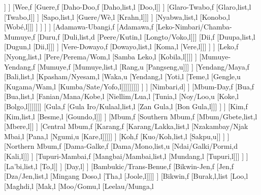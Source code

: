 \documentclass[landscape]{standalone}
\begin{document}
\begin{forest}
								[Tajausohn,l]]
							]
							[Wee,f
								[Guere,f
									[Daho-Doo,f
										[Daho,list,l
										[Doo,l]]
									]
									[Glaro-Twabo,f
										[Glaro,list,l
										[Twabo,l]]
									]
									[Sapo,list,l
									[Guere/Wè,l
									[Krahn,l]]]
								]
								[Nyabwa,list,l
								[Konobo,l
								[Wobé,l]]]
							]
						]
					]
				]
				[Adamawa-Ubangi,f
					[Adamawa,f
						[Leko-Nimbari/Chamba-Mumuye,f
							[Duru,f
								[Duli,list,d
								[Peere/Kutin,l
								[Longto/Voko,l]]]
								[Dii,f
									[Duupa,list,l
									[Dugun,l
									[Dii,l]]]
								]
								[Vere-Dowayo,f
									[Dowayo,list,l
									[Koma,l
									[Vere,l]]]
								]
							]
							[Leko,f
								[Nyong,list,l
								[Pere/Perema/Wom,l
								[Samba  Leko,l
								[Kobila,l]]]]
							]
							[Mumuye-Yendang,f
								[Mumuye,f
									[Mumuye,list,l
									[Rang,u
									[Pangseng,u]]]
								]
								[Yendang/Maya,f
									[Bali,list,l
									[Kpasham/Nyesam,l
									[Waka,u
									[Yendang,l
									[Yoti,l
									[Teme,l
									[Gengle,u
									[Kugama/Wam,l
									[Kumba/Sate/Yofo,l]]]]]]]]]
								]
							]
							[Nimbari,d]
						]
						[Mbum-Day,f
							[Bua,f
								[Bua,list,l
								[Fanian/Mana/Kobe,l
								[Niellim/Lua,l
								[Tunia,l
								[Noy/Loo,u
								[Koke,l
								[Bolgo,l]]]]]]]
								[Gula,f
									[Gula Iro/Kulaal,list,l
									[Zan Gula,l
									[Bon Gula,l]]]
								]
							]
							[Kim,f
								[Kim,list,l
								[Besme,l
								[Goundo,l]]]
							]
							[Mbum,f
								[Southern Mbum,f
									[Mbum/Gbete,list,l
									[Mbere,l]]
								]
								[Central Mbum,f
									[Karang,f
										[Karang/Lakka,list,l
										[Nzakambay/Njak Mbai,l
										[Pana,l
										[Ngumi,u
										[Kare,l]]]]]
									]
									[Koh,f
										[Kuo/Koh,list,l
										[Sakpu,u]]
									]
								]
								[Northern Mbum,f
									[Dama-Galke,f
										[Dama/Mono,list,u
										[Ndai/Galki/Pormi,d
										[Kali,l]]]
									]
									[Tupuri-Mambai,f
										[Mangbai/Mambai,list,l
										[Mundang,l
										[Tupuri,l]]]
									]
								]
								[La'bi,list,l
								[To,l]]
							]
							[Day,l]
						]
						[Bambukic/Trans-Benue,f
							[Bikwin-Jen,f
								[Jen,f
									[Dza/Jen,list,l
									[Mingang Doso,l
									[Tha,l
									[Joole,l]]]]
								]
								[Bikwin,f
									[Burak,l,list
									[Loo,l
									[Maghdi,l
									[Mak,l
									[Moo/Gomu,l
									[Leelau/Munga,l

\end{forest}
\end{document}
